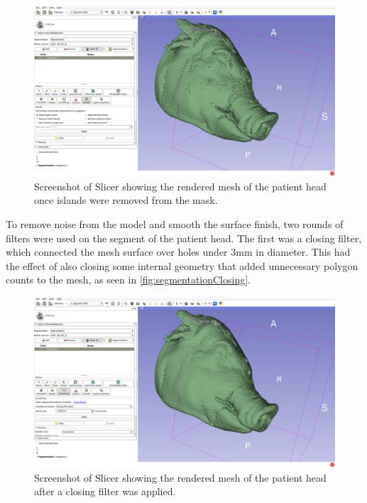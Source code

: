 \documentclass[12pt]{report}
\begin{document}
\begin{figure}[thpb]
	\centering
	\includegraphics[width=\textwidth]{images/segmentation_islands.png}
    \caption{Screenshot of Slicer showing the rendered mesh of the patient head once islands were removed from the mask.}
    \label{fig:slicerHeadMeshNoFilter}
\end{figure}

To remove noise from the model and smooth the surface finish, two rounds of filters were used on the segment of the patient head. The first was a closing filter, which connected the mesh surface over holes under 3mm in diameter. This had the effect of also closing some internal geometry that added unnecessary polygon counts to the mesh, as seen in \autoref{fig:segmentationClosing}.

\begin{figure}[thpb]
	\centering
	\includegraphics[width=\textwidth]{images/segmentation_closing.png}
    \caption{Screenshot of Slicer showing the rendered mesh of the patient head after a closing filter was applied.}
    \label{fig:segmentationClosing}
\end{figure}
\end{document}
